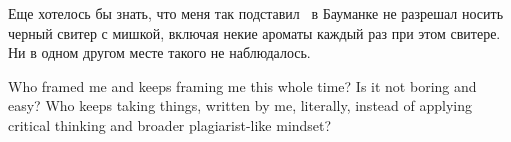 Еще хотелось бы знать, что меня так подставил \emdash\ в Бауманке не разрешал носить черный свитер с мишкой, включая некие ароматы каждый раз при этом свитере. Ни в одном другом месте такого не наблюдалось.

Who framed me and keeps framing me this whole time? Is it not boring and easy? Who keeps taking things, written by me, literally, instead of applying critical thinking and broader plagiarist-like  mindset?
